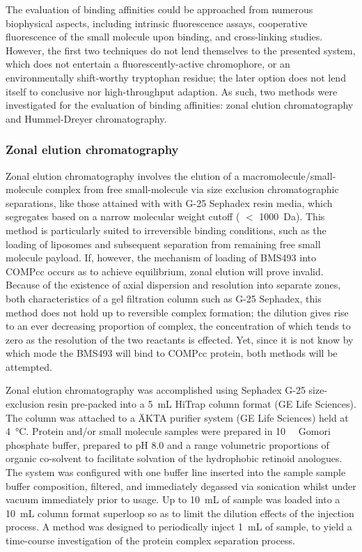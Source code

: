\begin{refsection}
The evaluation of binding affinities could be approached from numerous
biophysical aspects, including intrinsic fluorescence assays, cooperative
fluorescence of the small molecule upon binding, and cross-linking studies.
However, the first two techniques do not lend themselves to the presented
system, which does not entertain a fluorescently-active chromophore, or an
environmentally shift-worthy tryptophan residue; the later option does not lend
itself to conclusive nor high-throughput adaption. As such, two methods were
investigated for the evaluation of binding affinities: zonal elution
chromatography and Hummel-Dreyer chromatography.

\subsubsection{Zonal elution chromatography}

Zonal elution chromatography involves the elution of a
macromolecule/small-molecule complex from free small-molecule via size exclusion
chromatographic separations, like those attained with with G-25 Sephadex resin
media, which segregates based on a narrow molecular weight cutoff ( ${<}$
\SI{1000}{\dalton}). This method is particularly suited to irreversible binding
conditions, such as the loading of liposomes and subsequent separation from
remaining free small molecule payload.\cite{Pan2012,Wang2013} If, however, the
mechanism of loading of BMS493 into COMPcc occurs as to achieve equilibrium,
zonal elution will prove invalid. Because of the existence of axial dispersion
and resolution into separate zones, both characteristics of a gel filtration
column such as G-25 Sephadex, this method does not hold up to reversible complex
formation; the dilution gives rise to an ever decreasing proportion of complex,
the concentration of which tends to zero as the resolution of the two
reactants is effected.\cite{Winzor2001} Yet, since it is not know by which mode
the BMS493 will bind to COMPcc protein, both methods will be attempted.

Zonal elution chromatography was accomplished using Sephadex G-25 size-exclusion
resin pre-packed into a \SI{5}{\mL} HiTrap column format (GE Life Sciences). The
column was attached to a \"{A}KTA purifier system (GE Life Sciences) held at
\SI{4}{\celsius}. Protein and/or small molecule samples were prepared in
\SI{10}{\milli\moLar} Gomori phosphate buffer, prepared to pH 8.0 and a range
volumetric proportions of organic co-solvent to facilitate solvation of the
hydrophobic retinoid anologues. The system was configured with one buffer line
inserted into the sample sample buffer composition, filtered, and immediately
degassed via sonication whilst under vacuum immediately prior to usage. Up to
\SI{10}{\mL} of sample was loaded into a \SI{10}{\mL} column format superloop
so as to limit the dilution effects of the injection process. A method was
designed to periodically inject \SI{1}{\mL} of sample, to yield a time-course
investigation of the protein complex separation process.


\end{refsection}

